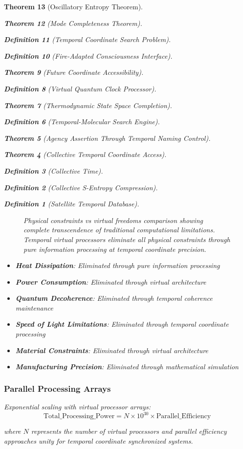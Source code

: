 \documentclass[12pt,a4paper]{article}
\newtheorem{theorem}{Theorem}[section]
\newtheorem{definition}[theorem]{Definition}
\begin{document}
\begin{theorem}[Oscillatory Entropy Theorem]
\begin{theorem}[Mode Completeness Theorem]
\begin{enumerate}
\begin{definition}[Temporal Coordinate Search Problem]
\begin{algorithm}
\begin{definition}[Fire-Adapted Consciousness Interface]
\begin{theorem}[Future Coordinate Accessibility]
\begin{definition}[Virtual Quantum Clock Processor]
\begin{itemize}
\begin{itemize}
\begin{theorem}[Thermodynamic State Space Completion]
\begin{definition}[Temporal-Molecular Search Engine]
\begin{theorem}[Agency Assertion Through Temporal Naming Control]
\begin{remark}
\begin{theorem}[Collective Temporal Coordinate Access]
\begin{definition}[Collective Time]
\begin{definition}[Collective S-Entropy Compression]
\begin{definition}[Satellite Temporal Database]
\begin{algorithm}
\begin{table}[h]
{\begin{figure}[h]
\begin{tikzpicture}[
    node distance=2cm,
    constraint/.style={rectangle, draw, text width=3cm, text centered, minimum height=1cm},
    arrow/.style={thick,->,>=stealth}
]
\end{tikzpicture}
\caption{Physical constraints vs virtual freedoms comparison showing complete transcendence of traditional computational limitations. Temporal virtual processors eliminate all physical constraints through pure information processing at temporal coordinate precision.}
\label{fig:constraints_transcendence}
\end{figure}

\begin{itemize}
\item \textbf{Heat Dissipation}: Eliminated through pure information processing
\item \textbf{Power Consumption}: Eliminated through virtual architecture
\item \textbf{Quantum Decoherence}: Eliminated through temporal coherence maintenance
\item \textbf{Speed of Light Limitations}: Eliminated through temporal coordinate processing
\item \textbf{Material Constraints}: Eliminated through virtual architecture
\item \textbf{Manufacturing Precision}: Eliminated through mathematical simulation
\end{itemize}

\subsubsection{Parallel Processing Arrays}

Exponential scaling with virtual processor arrays:
$$\text{Total\_Processing\_Power} = N \times 10^{30} \times \text{Parallel\_Efficiency}$$

where $N$ represents the number of virtual processors and parallel efficiency approaches unity for temporal coordinate synchronized systems.

}
\end{table}
\end{algorithm}
\end{definition}
\end{definition}
\end{definition}
\end{theorem}
\end{remark}
\end{theorem}
\end{definition}
\end{theorem}
\end{itemize}
\end{itemize}
\end{definition}
\end{theorem}
\end{definition}
\end{algorithm}
\end{definition}
\end{enumerate}
\end{theorem}
\end{theorem}
\end{document}
